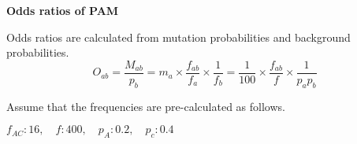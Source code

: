 \question \textbf{Odds ratios of PAM}

Odds ratios are calculated from mutation probabilities and background probabilities.
\[
O_{ab} = \dfrac{M_{ab}}{p_b} 
= m_a \times \dfrac{f_{ab}}{f_a} \times \dfrac{1}{f_b}
= \dfrac{1}{100} \times \dfrac{f_{ab}}{f} \times \dfrac{1}{p_{a}p_{b}}
\]

\noindent
Assume that the frequencies are pre-calculated as follows.
\begin{center}
$f_{AC}: 16, \quad f: 400, \quad p_A: 0.2, \quad p_c: 0.4 $
\end{center}


